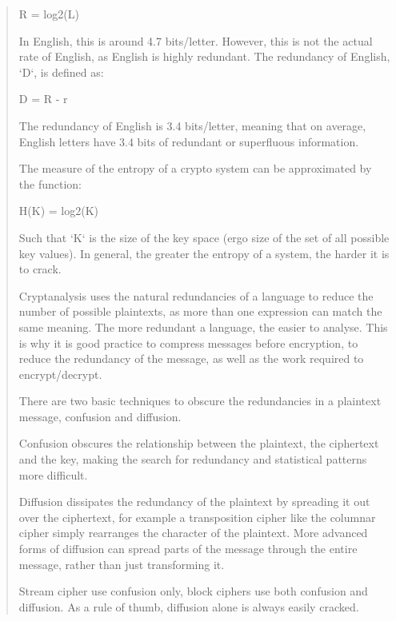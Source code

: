 \documentclass[12pt, a4paper, draft]{report}
\begin{document}
\begin{quote}
    R = log2(L)

In English, this is around 4.7 bits/letter. However, this is not the actual
rate of English, as English is highly redundant. The redundancy of English, `D`, is defined as:

    D = R - r

The redundancy of English is 3.4 bits/letter, meaning that on average,
English letters have 3.4 bits of redundant or superfluous information.

The measure of the entropy of a crypto system can be approximated by the function:

    H(K) = log2(K)

Such that `K` is the size of the key space (ergo size of the set of all possible
key values). In general, the greater the entropy of a system, the harder it is to crack.

Cryptanalysis uses the natural redundancies of a language to reduce the number
of possible plaintexts, as more than one expression can match the same meaning. The more redundant a language, the easier to analyse. This is why it is good practice to compress messages before encryption, to reduce the redundancy of the message, as well as the work required to encrypt/decrypt.

There are two basic techniques to obscure the redundancies in a plaintext
message, confusion and diffusion.

Confusion obscures the relationship between the plaintext, the ciphertext and the
key, making the search for redundancy and statistical patterns more difficult.

Diffusion dissipates the redundancy of the plaintext by spreading it out over the
ciphertext, for example a transposition cipher like the columnar cipher simply rearranges the character of the plaintext. More advanced forms of diffusion can spread parts of the message through the entire message, rather than just transforming it.

Stream cipher use confusion only, block ciphers use both confusion and diffusion.
As a rule of thumb, diffusion alone is always easily cracked.
\end{quote}
\end{document}
